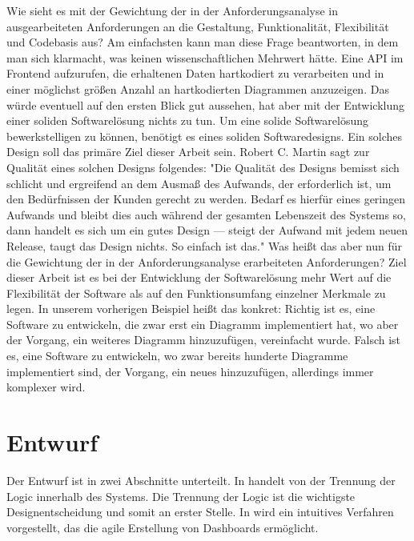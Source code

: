 Wie sieht es mit der Gewichtung der in der Anforderungsanalyse in 
ausgearbeiteten Anforderungen an die Gestaltung, Funktionalität, Flexibilität und Codebasis aus?
Am einfachsten kann man diese Frage beantworten, in dem man sich klarmacht, was keinen wissenschaftlichen
Mehrwert hätte. Eine API im Frontend aufzurufen, die erhaltenen Daten hartkodiert zu verarbeiten und
in einer möglichst größen Anzahl an hartkodierten Diagrammen anzuzeigen. Das würde eventuell auf den
ersten Blick gut aussehen, hat aber mit der Entwicklung einer soliden Softwarelösung nichts zu tun.
Um eine solide Softwarelösung bewerkstelligen zu können, benötigt es eines soliden Softwaredesigns.
Ein solches Design soll das primäre Ziel dieser Arbeit sein. Robert C. Martin sagt zur Qualität eines
solchen Designs folgendes:
"Die Qualität des Designs bemisst sich schlicht und ergreifend an dem Ausmaß des Aufwands, der
erforderlich ist, um den Bedürfnissen der Kunden gerecht zu werden. Bedarf es hierfür eines
geringen Aufwands und bleibt dies auch während der gesamten Lebenszeit des Systems so,
dann handelt es sich um ein gutes Design — steigt der Aufwand mit jedem neuen Release,
taugt das Design nichts. So einfach ist das."\cite[S. 30]{RobertC.Martin2018} Was heißt
das aber nun für die Gewichtung der in der Anforderungsanalyse erarbeiteten Anforderungen?
Ziel dieser Arbeit ist es bei der Entwicklung der Softwarelösung mehr Wert auf die Flexibilität
der Software als auf den Funktionsumfang einzelner Merkmale zu legen. In unserem
vorherigen Beispiel heißt das konkret: Richtig ist es, eine Software zu entwickeln, die zwar erst ein Diagramm
implementiert hat, wo aber der Vorgang, ein weiteres Diagramm hinzuzufügen, vereinfacht wurde.
Falsch ist es, eine Software zu entwickeln, wo zwar bereits hunderte Diagramme implementiert sind,
der Vorgang, ein neues hinzuzufügen, allerdings immer komplexer wird.

\section{Entwurf}
\label{sec:entwurf}
Der Entwurf ist in zwei Abschnitte unterteilt. In  handelt von
der Trennung der Logic innerhalb des Systems. Die Trennung der Logic ist die wichtigste
Designentscheidung und somit an erster Stelle. In 
wird ein intuitives Verfahren vorgestellt, das die agile Erstellung von Dashboards
ermöglicht.


